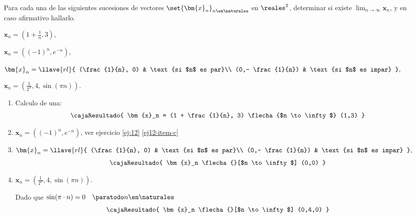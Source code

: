 \begin{enunciado}{\ejercicio}
  Para cada una de las siguientes sucesiones de vectores $\set{\bm{x}_n}_{n\en\naturales}$ en $\reales^2$,
  determinar si existe $\lim_{n \to \infty} \bm{x}_n$, y en caso afirmativo hallarlo.
  \begin{enumerate}[label=\alph*)]
    \begin{multicols}{2}
      \item $\bm{x}_n = (1 + \frac{1}{n}, 3)$,

      \item $\bm{x}_n = ((-1)^n, e^{-n})$,

      \item $\bm{x}_n =
        \llave{rl}{
          (\frac{1}{n}, 0) & \text{si $n$ es par}\\
          (0,- \frac{1}{n}) & \text{si $n$ es impar}
        },
      $

      \item $
        \bm{x}_n = (\frac{1}{2^n}, 4, \sin(\pi n)).
      $
    \end{multicols}
  \end{enumerate}
\end{enunciado}

\begin{enumerate}[label=\alph*)]
  \item Calculo de una:
        $$
          \cajaResultado{
            \bm{x}_n = (1 + \frac{1}{n}, 3) \flecha{$n \to \infty$} (1,3)
          }
        $$

  \item $\bm{x}_n = ((-1)^n, e^{-n})$,  ver ejercicio \ref{ej:12} \ref{ej12-item-c}

  \item $\bm{x}_n =
          \llave{rl}{
            (\frac{1}{n}, 0) & \text{si $n$ es par}\\
            (0,- \frac{1}{n}) & \text{si $n$ es impar}
          },
        $
        $$
          \cajaResultado{
            \bm{x}_n \flecha{}[$n \to \infty$] (0,0)
          }
        $$

  \item $
          \bm{x}_n = (\frac{1}{2^n}, 4, \sin(\pi n)).
        $

        Dado que $\sin(\pi \cdot n) = 0 \quad \paratodo n \en \naturales$
        $$
          \cajaResultado{
            \bm{x}_n \flecha{}[$n \to \infty$] (0,4,0)
          }
        $$
\end{enumerate}

\begin{aportes}
  \item {}
\end{aportes}

